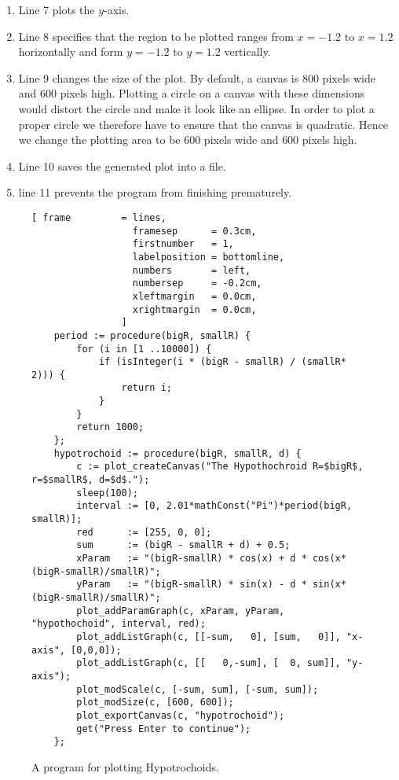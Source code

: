 \begin{enumerate}
\item Line 7 plots the $y$-axis.
\item Line 8 specifies that the region to be plotted ranges from $x=-1.2$ to $x=1.2$ horizontally
      and form $y=-1.2$ to $y=1.2$ vertically. 
\item Line 9 changes the size of the plot.  By default, a canvas is $800$ pixels wide and $600$
      pixels high.  Plotting a circle on a canvas with these dimensions would distort the circle and
      make it look like an ellipse.  In order to plot a proper circle we therefore have to ensure
      that the canvas is quadratic.  Hence we change the plotting area to be $600$ pixels wide and
      $600$ pixels high. 
\item Line 10 saves the generated plot into a file.
\item line 11 prevents the program from finishing prematurely.
\end{enumerate}


\begin{figure}[!ht]
\centering
\begin{Verbatim}[ frame         = lines, 
                  framesep      = 0.3cm, 
                  firstnumber   = 1,
                  labelposition = bottomline,
                  numbers       = left,
                  numbersep     = -0.2cm,
                  xleftmargin   = 0.0cm,
                  xrightmargin  = 0.0cm,
                ]
    period := procedure(bigR, smallR) {
        for (i in [1 ..10000]) {
            if (isInteger(i * (bigR - smallR) / (smallR* 2))) {
                return i;
            }
        }
        return 1000;
    };
    hypotrochoid := procedure(bigR, smallR, d) {
        c := plot_createCanvas("The Hypothochroid R=$bigR$, r=$smallR$, d=$d$.");
        sleep(100);
        interval := [0, 2.01*mathConst("Pi")*period(bigR, smallR)];
        red      := [255, 0, 0];
        sum      := (bigR - smallR + d) + 0.5;
        xParam   := "(bigR-smallR) * cos(x) + d * cos(x*(bigR-smallR)/smallR)";
        yParam   := "(bigR-smallR) * sin(x) - d * sin(x*(bigR-smallR)/smallR)";
        plot_addParamGraph(c, xParam, yParam, "hypothochoid", interval, red);
        plot_addListGraph(c, [[-sum,   0], [sum,   0]], "x-axis", [0,0,0]);
        plot_addListGraph(c, [[   0,-sum], [  0, sum]], "y-axis");   
        plot_modScale(c, [-sum, sum], [-sum, sum]);
        plot_modSize(c, [600, 600]);
        plot_exportCanvas(c, "hypotrochoid");
        get("Press Enter to continue");
    };
\end{Verbatim}
\vspace*{-0.3cm}
\caption{A program for plotting Hypotrochoids.}
\label{fig:hypotrochoid.stlx}
\end{figure}

